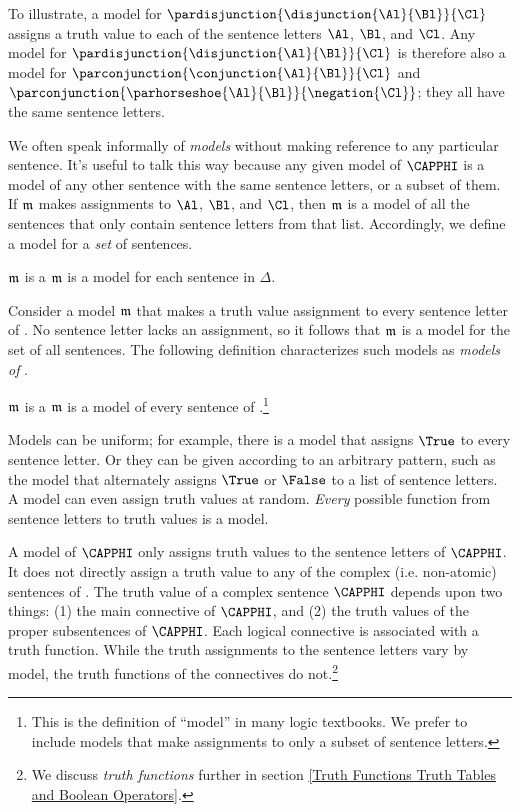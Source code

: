 To illustrate, a model for $\pardisjunction{\disjunction{\Al}{\Bl}}{\Cl}$ assigns a truth value to each of the sentence letters $\Al$, $\Bl$, and $\Cl$.
Any model for $\pardisjunction{\disjunction{\Al}{\Bl}}{\Cl}$ is therefore also a model for $\parconjunction{\conjunction{\Al}{\Bl}}{\Cl}$ and $\parconjunction{\parhorseshoe{\Al}{\Bl}}{\negation{\Cl}}$; they all have the same sentence letters.

We often speak informally of \emph{models} without making reference to any particular \GSL{} sentence.  It's useful to talk this way because any given model of $\CAPPHI$ is a model of any other \GSL{} sentence with the same sentence letters, or a subset of them.  If $\mathfrak{m}$ makes assignments to $\Al$, $\Bl$, and $\Cl$, then $\mathfrak{m}$ is a model of all the sentences that only contain sentence letters from that list.  Accordingly, we define a model for a \emph{set} of \GSL{} sentences.

\begin{majorILnc}{}
	$\mathfrak{m}$ is a  \Iff $\mathfrak{m}$ is a model for each sentence in $\Delta$.
\end{majorILnc}

Consider a model $\mathfrak{m}$ that makes a truth value assignment to every sentence letter of \GSL{}.  No sentence letter lacks an assignment, so it follows that $\mathfrak{m}$ is a model for the set of all \GSL{} sentences.  The following definition characterizes such models as \emph{models of \GSL{}}.

\begin{majorILnc}{}
	$\mathfrak{m}$ is a  \Iff $\mathfrak{m}$ is a model of every sentence of \GSL{}.\footnote{
		This is the definition of ``model'' in many logic textbooks.
		We prefer to include models that make assignments to only a subset of sentence letters.
	}
\end{majorILnc}

Models can be uniform; for example, there is a model that assigns $\True$ to every sentence letter.
Or they can be given according to an arbitrary pattern, such as the model that alternately assigns $\True$ or $\False$ to a list of sentence letters.
A model can even assign truth values at random. 
\emph{Every} possible function from sentence letters to truth values is a model.

A model of $\CAPPHI$ only assigns truth values to the sentence letters of $\CAPPHI$.
It does not directly assign a truth value to any of the complex (i.e. non-atomic) sentences of \GSL{}.
The truth value of a complex sentence $\CAPPHI$ depends upon two things: (1) the main connective of $\CAPPHI$, and (2) the truth values of the proper subsentences of $\CAPPHI$.
Each logical connective is associated with a truth function.
While the truth assignments to the sentence letters vary by model, the truth functions of the connectives do not.\footnote{We discuss \emph{truth functions} further in section \ref{Truth Functions Truth Tables and Boolean Operators}.}

